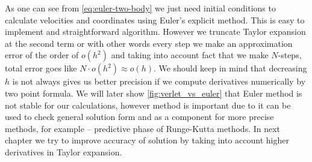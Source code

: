 \documentclass[10pt]{article}
\begin{document}
As one can see from \ref{eq:euler-two-body} we just need initial conditions to calculate velocities and coordinates using Euler's explicit method. This is  easy to implement and straightforward algorithm. However we truncate Taylor expansion at the second term or with other words every step we make an approximation error of the order of $o(h^2)$ and taking into account fact that we make $N$-steps, total error goes like $N\cdot o(h^2)\approx o(h)$.
We should keep in mind that decreasing $h$ is not always gives us better precision if we compute derivatives numerically by two point formula.
We will later show \ref{fig:verlet_vs_euler} that Euler method is not stable for our calculations, however method is important due to it can be used to check general solution form and as a component for more precise methods, for example -- predictive phase of Runge-Kutta methods.
In next chapter we try to improve accuracy of solution by taking into account higher derivatives in Taylor expansion.
\end{document}
